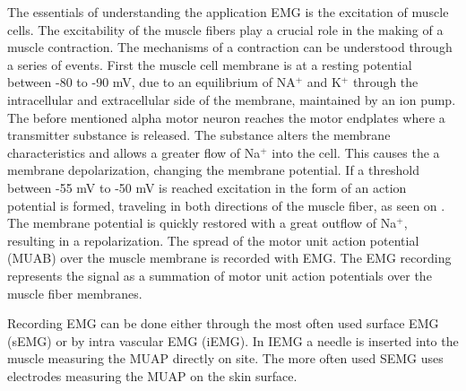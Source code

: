 The essentials of understanding the application EMG is the excitation of muscle cells. The excitability of the muscle fibers play a crucial role in the making of a muscle contraction. The mechanisms of a contraction can be understood through a series of events. First the muscle cell membrane is at a resting potential between -80 to -90 mV, due to an equilibrium of NA$^+$ and K$^+$ through the intracellular and extracellular side of the membrane, maintained by an ion pump. The before mentioned alpha motor neuron reaches the motor endplates where a transmitter substance is released. The substance alters the membrane characteristics and allows a greater flow of Na$^+$ into the cell. This causes the a membrane depolarization, changing the membrane potential. If a threshold between -55 mV to -50 mV is reached excitation in the form of an action potential is formed, traveling in both directions of the muscle fiber, as seen on . The membrane potential is quickly restored with a great outflow of Na$^+$, resulting in a repolarization. The spread of the motor unit action potential (MUAB) over the muscle membrane is recorded with EMG. The EMG recording represents the signal as a summation of motor unit action potentials over the muscle fiber membranes.\cite{Cram2012,Martini2012} 

Recording EMG can be done either through the most often used surface EMG (sEMG) or by intra vascular EMG (iEMG). In IEMG a needle is inserted into the muscle measuring the MUAP directly on site. The more often used SEMG uses electrodes measuring the MUAP on the skin surface.\cite{Cram2012} 




 
 



